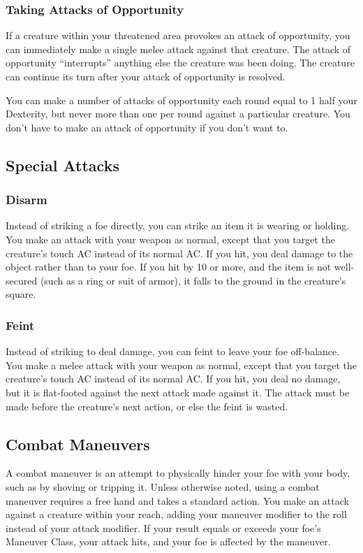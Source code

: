 \subsubsection{Taking Attacks of Opportunity}
If a creature within your threatened area provokes an attack of opportunity, you can immediately make a single melee attack against that creature. The attack of opportunity ``interrupts'' anything else the creature was been doing. The creature can continue its turn after your attack of opportunity is resolved.

You can make a number of attacks of opportunity each round equal to 1 \add half your Dexterity, but never more than one per round against a particular creature. You don't have to make an attack of opportunity if you don't want to.

\subsection{Special Attacks}

\subsubsection{Disarm}\label{Disarm}
Instead of striking a foe directly, you can strike an item it is wearing or holding. You make an attack with your weapon as normal, except that you target the creature's touch AC instead of its normal AC. If you hit, you deal damage to the object rather than to your foe. If you hit by 10 or more, and the item is not well-secured (such as a ring or suit of armor), it falls to the ground in the creature's square.

\subsubsection{Feint}\label{Feint}
Instead of striking to deal damage, you can feint to leave your foe off-balance. You make a melee attack with your weapon as normal, except that you target the creature's touch AC instead of its normal AC. If you hit, you deal no damage, but it is flat-footed against the next attack made against it. The attack must be made before the creature's next action, or else the feint is wasted.

\subsection{Combat Maneuvers}\label{Combat Maneuvers}
A combat maneuver is an attempt to physically hinder your foe with your body, such as by shoving or tripping it. Unless otherwise noted, using a combat maneuver requires a free hand and takes a standard action. You make an attack against a creature within your reach, adding your maneuver modifier to the roll instead of your attack modifier. If your result equals or exceeds your foe's Maneuver Class, your attack hits, and your foe is affected by the maneuver.

